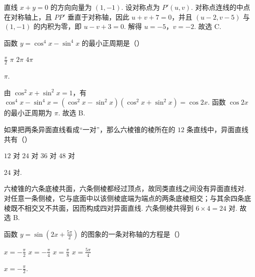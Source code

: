 \begin{solution}
直线 \(x+y=0\) 的方向向量为 \((1,-1)\). 设对称点为 \(P'(u,v)\). 对称点连线的中点在对称轴上，且 \(PP'\) 垂直于对称轴，因此 \(u+v+7=0\)，并且 \((u-2,v-5)\) 与 \((1,-1)\) 的内积为零，即 \(u-v+3=0\). 解得 \(u=-5\)，\(v=-2\). 故选 C.
\end{solution}

\begin{problem}
函数 \(y = \cos^{4} x - \sin^{4} x\) 的最小正周期是（\quad）

\choices
    {\(\frac{\pi}{2}\)}
    {\(\pi\)}
    {\(2\pi\)}
    {\(4\pi\)}
\end{problem}

\begin{answer}
\(\pi\).
\end{answer}

\begin{solution}
由 \(\cos^2x+\sin^2x=1\)，有 \(\cos^4x-\sin^4x=(\cos^2x-\sin^2x)(\cos^2x+\sin^2x)=\cos2x\). 函数 \(\cos2x\) 的最小正周期为 \(\pi\). 故选 B.
\end{solution}

\begin{problem}
如果把两条异面直线看成“一对”，那么六棱锥的棱所在的 \(12\) 条直线中，异面直线共有（\quad）

\choices
    {\(12\) 对}
    {\(24\) 对}
    {\(36\) 对}
    {\(48\) 对}
\end{problem}

\begin{answer}
\(24\) 对.
\end{answer}

\begin{solution}
六棱锥的六条底棱共面，六条侧棱都经过顶点，故同类直线之间没有异面直线对. 对任意一条侧棱，它与底面中以该侧棱底端为端点的两条底棱相交；与其余四条底棱既不相交又不共面，因而构成四对异面直线. 六条侧棱共得到 \(6\times4=24\) 对. 故选 B.
\end{solution}

\begin{problem}
函数 \(y = \sin \left(2x + \frac{5\pi}{2}\right)\) 的图象的一条对称轴的方程是（\quad）

\choices
    {\(x = -\frac{\pi}{2}\)}
    {\(x = -\frac{\pi}{4}\)}
    {\(x = \frac{\pi}{8}\)}
    {\(x = \frac{5\pi}{4}\)}
\end{problem}

\begin{answer}
\(x=-\frac{\pi}{2}\).
\end{answer}

